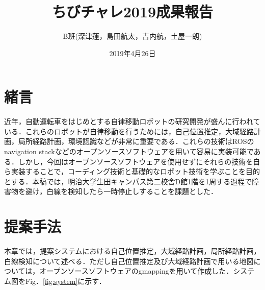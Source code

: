 \documentclass{jarticle}
\renewcommand{\%}{\textsf{\char`\%}}
\begin{document}
\title{ちびチャレ2019成果報告}
\author{B班(深津蓮，島田航太，吉内航，土屋一朗)}
\date{2019年4月26日}
\maketitle
\section{緒言}
近年，自動運転車をはじめとする自律移動ロボットの研究開発が盛んに行われている．これらのロボットが自律移動を行うためには，自己位置推定，大域経路計画，局所経路計画，環境認識などが非常に重要である．これらの技術はROSのnavigation stack\cite{ns}などのオープンソースソフトウェアを用いて容易に実装可能である．しかし，今回はオープンソースソフトウェアを使用せずにそれらの技術を自ら実装することで，コーディング技術と基礎的なロボット技術を学ぶことを目的とする．本稿では，明治大学生田キャンパス第二校舎D館1階を1周する過程で障害物を避け，白線を検知したら一時停止しすることを課題とした．
\section{提案手法}
本章では，提案システムにおける自己位置推定，大域経路計画，局所経路計画，白線検知について述べる．ただし自己位置推定及び大域経路計画で用いる地図については，オープンソースソフトウェアのgmapping\cite{gmapping}を用いて作成した．システム図をFig．\ref{fig:system}に示す．
\end{document}
